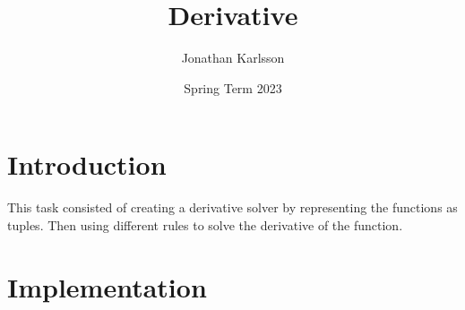\documentclass[a4paper,11pt]{article}
\begin{document}
\title{
    \textbf{Derivative}
}
\author{Jonathan Karlsson}
\date{Spring Term 2023}

\maketitle

\section*{Introduction}

This task consisted of creating a derivative solver by representing the functions as tuples. Then using different rules to solve the derivative of the function.

\section*{Implementation}
\end{document}
